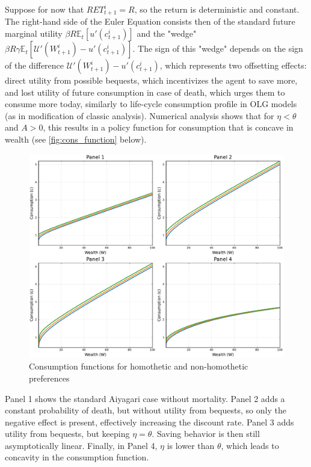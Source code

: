 \documentclass[12pt]{article}
\begin{document}
Suppose for now that $RET_{t+1}^i = R$, so the return is deterministic and constant. The right-hand side of the Euler Equation consists then of the standard future marginal utility $\beta R \mathbb{E}_t \left[ u'\left(c_{t+1}^{i}\right) \right]$ and the "wedge" $\beta R \gamma \mathbb{E}_t \left[ \mathcal{U}'\left(W_{t+1}^{i}\right) - u'\left(c_{t+1}^{i}\right) \right]$. The sign of this "wedge" depends on the sign of the difference $\mathcal{U}'\left(W_{t+1}^{i}\right) - u'\left(c_{t+1}^{i}\right)$, which represents two offsetting effects: direct utility from possible bequests, which incentivizes the agent to save more, and lost utility of future consumption in case of death, which urges them to consume more today, similarly to life-cycle consumption profile in OLG models (as in \textcite{yaari1965} modification of classic \textcite{modigliani1954} analysis). Numerical analysis shows that for $\eta<\theta$ and $A>0$, this results in a policy function for consumption that is concave in wealth (see \autoref{fig:cons_function} below).

\begin{figure}[h]
    \centering
    \includegraphics[width=1.0\textwidth]{figure_1.pdf}
    \caption{Consumption functions for homothetic and non-homothetic preferences}
    \label{fig:cons_function}
\end{figure}

Panel 1 shows the standard Aiyagari case without mortality. Panel 2 adds a constant probability of death, but without utility from bequests, so only the negative effect is present, effectively increasing the discount rate. Panel 3 adds utility from bequests, but keeping $\eta=\theta$. Saving behavior is then still asymptotically linear. Finally, in Panel 4, $\eta$ is lower than $\theta$, which leads to concavity in the consumption function.
\end{document}
